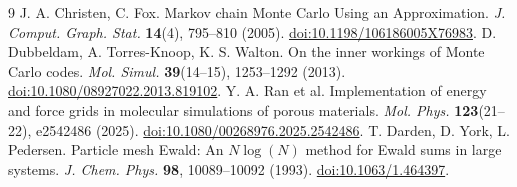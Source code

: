 \documentclass[11pt,a4paper]{article}
\begin{document}
\begingroup\small
\begin{thebibliography}{9}
\setlength{\itemsep}{3pt}\setlength{\parskip}{0pt}
 J. A. Christen, C. Fox.
Markov chain Monte Carlo Using an Approximation.
\textit{J. Comput. Graph. Stat.} \textbf{14}(4), 795--810 (2005).
\href{https://doi.org/10.1198/106186005X76983}{doi:10.1198/106186005X76983}.
 D. Dubbeldam, A. Torres-Knoop, K. S. Walton.
On the inner workings of Monte Carlo codes.
\textit{Mol. Simul.} \textbf{39}(14--15), 1253--1292 (2013).
\href{https://doi.org/10.1080/08927022.2013.819102}{doi:10.1080/08927022.2013.819102}.
 Y. A. Ran et al.
Implementation of energy and force grids in molecular simulations of porous materials.
\textit{Mol. Phys.} \textbf{123}(21--22), e2542486 (2025).
\href{https://doi.org/10.1080/00268976.2025.2542486}{doi:10.1080/00268976.2025.2542486}.
 T. Darden, D. York, L. Pedersen.
Particle mesh Ewald: An $N\log(N)$ method for Ewald sums in large systems.
\textit{J. Chem. Phys.} \textbf{98}, 10089--10092 (1993).
\href{https://doi.org/10.1063/1.464397}{doi:10.1063/1.464397}.
\end{thebibliography}
\endgroup
\end{document}
